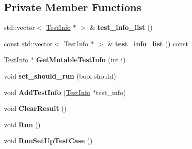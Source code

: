 \subsection*{Private Member Functions}
\begin{DoxyCompactItemize}
\item 
\mbox{\label{classtesting_1_1_test_case_adbfcf952eb18dc82d4b20f6bc31aee04}} 
std\+::vector$<$ \hyperlink{classtesting_1_1_test_info}{Test\+Info} $\ast$ $>$ \& {\bfseries test\+\_\+info\+\_\+list} ()
\item 
\mbox{\label{classtesting_1_1_test_case_a7b4460807b77fd63922528a76daf38ba}} 
const std\+::vector$<$ \hyperlink{classtesting_1_1_test_info}{Test\+Info} $\ast$ $>$ \& {\bfseries test\+\_\+info\+\_\+list} () const
\item 
\mbox{\label{classtesting_1_1_test_case_a6d608750bc778667254254fe801cafd5}} 
\hyperlink{classtesting_1_1_test_info}{Test\+Info} $\ast$ {\bfseries Get\+Mutable\+Test\+Info} (int i)
\item 
\mbox{\label{classtesting_1_1_test_case_a58ecf00d6682b83caef887682b6012f0}} 
void {\bfseries set\+\_\+should\+\_\+run} (bool should)
\item 
\mbox{\label{classtesting_1_1_test_case_a21ca9697c5f91554c752411f8ea556cf}} 
void {\bfseries Add\+Test\+Info} (\hyperlink{classtesting_1_1_test_info}{Test\+Info} $\ast$test\+\_\+info)
\item 
\mbox{\label{classtesting_1_1_test_case_a4d0498738f8903130a8d0400932e8b54}} 
void {\bfseries Clear\+Result} ()
\item 
\mbox{\label{classtesting_1_1_test_case_a6f5b3724cd5a8e446cd48a6150d08cde}} 
void {\bfseries Run} ()
\item 
\mbox{\label{classtesting_1_1_test_case_a10763d318d617f921803741ec81919c5}} 
void {\bfseries Run\+Set\+Up\+Test\+Case} ()
\item 
\mbox{\label{classtesting_1_1_test_case_a23563c9cbbd004159c6acef2af0e7c39}} 

\end{DoxyCompactItemize}

